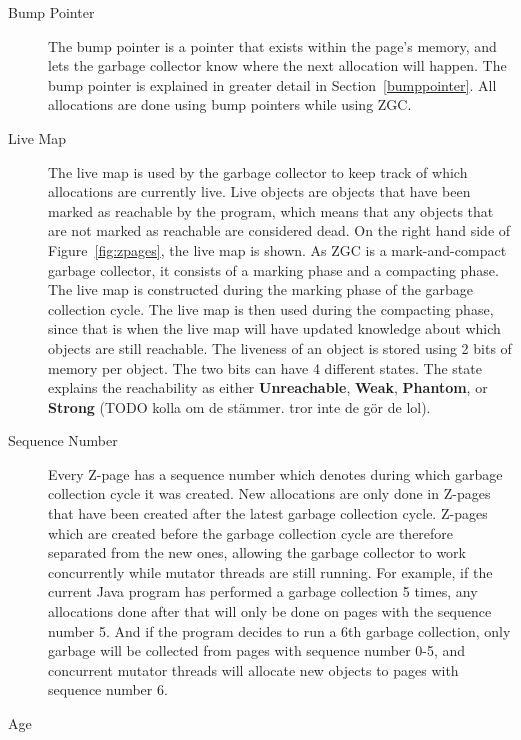 \begin{description}
    \item[Bump Pointer]
        The bump pointer is a pointer that exists within the page's memory, and lets the garbage collector know where the next allocation will happen. The bump pointer is explained in greater detail in Section~\ref{bumppointer}. All allocations are done using bump pointers while using ZGC.
    \item[Live Map]
        The live map is used by the garbage collector to keep track of which allocations are currently live. Live objects are objects that have been marked as reachable by the program, which means that any objects that are not marked as reachable are considered dead. On the right hand side of Figure~\ref*{fig:zpages}, the live map is shown. As ZGC is a mark-and-compact garbage collector, it consists of a marking phase and a compacting phase. The live map is constructed during the marking phase of the garbage collection cycle. The live map is then used during the compacting phase, since that is when the live map will have updated knowledge about which objects are still reachable. The liveness of an object is stored using 2 bits of memory per object. The two bits can have 4 different states. The state explains the reachability as either \textbf{Unreachable}, \textbf{Weak}, \textbf{Phantom}, or \textbf{Strong} (TODO kolla om de stämmer. tror inte de gör de lol).
    \item[Sequence Number]
        Every Z-page has a sequence number which denotes during which garbage collection cycle it was created. New allocations are only done in Z-pages that have been created after the latest garbage collection cycle. Z-pages which are created before the garbage collection cycle are therefore separated from the new ones, allowing the garbage collector to work concurrently while mutator threads are still running. For example, if the current Java program has performed a garbage collection 5 times, any allocations done after that will only be done on pages with the sequence number 5. And if the program decides to run a 6th garbage collection, only garbage will be collected from pages with sequence number 0-5, and concurrent mutator threads will allocate new objects to pages with sequence number 6.
    \item[Age]

\end{description}
